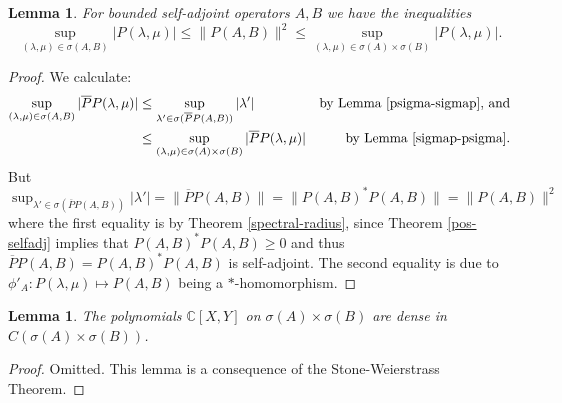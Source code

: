 \documentclass[12pt,oneside]{report}
\newtheorem{lem}[thm]{Lemma}
\begin{document}
\begin{lem}\label{spectral-ub}
    For bounded self-adjoint operators $A,B$ we have the inequalities$$\sup_{(\lambda,\mu) \in \sigma(A,B)} |P(\lambda,\mu)| \le \|P(A,B)\|^{2} \le \sup_{(\lambda,\mu) \in \sigma(A)\times\sigma(B)} |P(\lambda,\mu)|.$$
\end{lem}
\begin{proof}
    We calculate:
    \begin{align*}
        \sup_{(\lambda,\mu) \in \sigma(A,B)} |\overline{P}P(\lambda,\mu)|
        &\leq \sup_{\lambda' \in \sigma(\overline{P}P(A,B))} |\lambda'| & \text{by Lemma \ref{psigma-sigmap}, and} \\
        &\leq \sup_{(\lambda,\mu) \in \sigma(A) \times \sigma(B)} |\overline{P}P(\lambda,\mu)| & \text{by Lemma \ref{sigmap-psigma}}.
    \end{align*}
    But $\sup_{\lambda' \in \sigma(\overline{P}P(A,B))} |\lambda'| = \|\overline{P}P(A,B)\| = \|P(A,B)^{*}P(A,B)\| = \|P(A,B)\|^{2}$ where the first equality is by Theorem \ref{spectral-radius}, since Theorem \ref{pos-selfadj} implies that $P(A,B)^{*}P(A,B) \geq 0$ and thus $\overline{P}P(A,B) = P(A,B)^{*}P(A,B)$ is self-adjoint. The second equality is due to $\phi'_{A} : P(\lambda,\mu) \mapsto P(A,B)$ being a $*$-homomorphism.
\end{proof}

\begin{lem}
    The polynomials $\mathbb{C}[X,Y]$ on $\sigma(A) \times \sigma (B)$ are dense in $C(\sigma(A) \times \sigma(B))$.
\end{lem}
\begin{proof}
    Omitted. This lemma is a consequence of the Stone-Weierstrass Theorem.
\end{proof}
\end{document}
